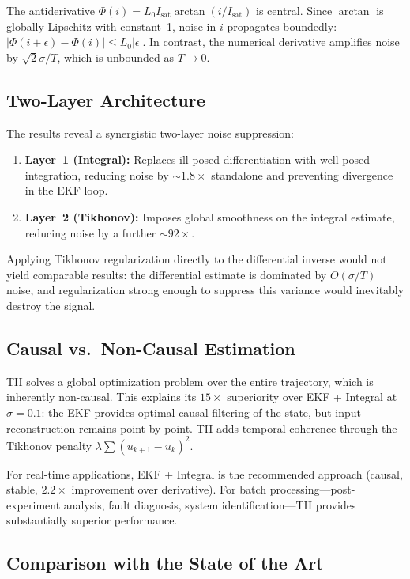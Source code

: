 \documentclass[lettersize,journal]{IEEEtran}
\begin{document}
The antiderivative $\Phi(i) = L_0 I_{\text{sat}} \arctan(i/I_{\text{sat}})$ is central. Since $\arctan$ is globally Lipschitz with constant~1, noise in $i$ propagates boundedly: $|\Phi(i+\epsilon) - \Phi(i)| \leq L_0|\epsilon|$. In contrast, the numerical derivative amplifies noise by $\sqrt{2}\sigma/T$, which is unbounded as $T \to 0$.

\subsection{Two-Layer Architecture}

The results reveal a synergistic two-layer noise suppression:
\begin{enumerate}
    \item \textbf{Layer~1 (Integral):} Replaces ill-posed differentiation with well-posed integration, reducing noise by ${\sim}1.8\times$ standalone and preventing divergence in the EKF loop.
    \item \textbf{Layer~2 (Tikhonov):} Imposes global smoothness on the integral estimate, reducing noise by a further ${\sim}92\times$.
\end{enumerate}
Applying Tikhonov regularization directly to the differential inverse would not yield comparable results: the differential estimate is dominated by $O(\sigma/T)$ noise, and regularization strong enough to suppress this variance would inevitably destroy the signal.

\subsection{Causal vs.\ Non-Causal Estimation}

TII solves a global optimization problem over the entire trajectory, which is inherently non-causal. This explains its $15\times$ superiority over EKF + Integral at $\sigma = 0.1$: the EKF provides optimal causal filtering of the state, but input reconstruction remains point-by-point. TII adds temporal coherence through the Tikhonov penalty $\lambda\sum(u_{k+1} - u_k)^2$.

For real-time applications, EKF + Integral is the recommended approach (causal, stable, $2.2\times$ improvement over derivative). For batch processing---post-experiment analysis, fault diagnosis, system identification---TII provides substantially superior performance.

\subsection{Comparison with the State of the Art}
\end{document}
